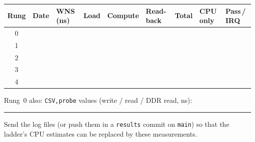 \documentclass[11pt,a4paper]{article}
\newcommand{\code}[1]{\texttt{#1}}
\renewcommand{\_}{\oldunderscore\allowbreak{}}
\begin{document}
\begin{table}[H]
\centering
\small
\renewcommand{\arraystretch}{1.6}
\begin{tabularx}{\textwidth}{@{}c|Y|Y|Y|Y|Y|Y|Y|Y@{}}
\toprule
\textbf{Rung} & \textbf{Date} & \textbf{WNS (ns)} & \textbf{Load} & \textbf{Com\-pute} & \textbf{Read-back} & \textbf{Total} & \textbf{CPU only} & \textbf{Pass\,/ IRQ} \\
 & & & & & & & & \\
1 & & & & & & & & \\
2 & & & & & & & & \\
3 & & & & & & & & \\
4 & & & & & & & & \\
\bottomrule
\end{tabularx}
\end{table}
Rung~0 also: \code{CSV,probe} values (write / read / DDR read, ns): \rule{4cm}{0.4pt}

Send the log files (or push them in a \code{results} commit on \code{main}) so that the ladder's CPU estimates can be replaced by these measurements.

\end{document}
